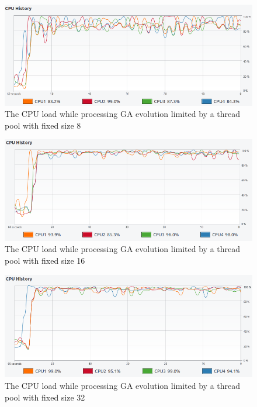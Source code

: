 \begin{figure}[t]
\centering\includegraphics[width=\textwidth]{img/exp/2/limit-threadpool-8}
\caption{The CPU load while processing GA evolution limited by a thread pool with fixed size 8 }  \label{img:cpu-thread-8}
\end{figure}

\begin{figure}[t]
\centering\includegraphics[width=\textwidth]{img/exp/2/limit-threadpool-16}
\caption{The CPU load while processing GA evolution limited by a thread pool with fixed size 16 }  \label{img:cpu-thread-16}
\end{figure}

\begin{figure}[t]
\centering\includegraphics[width=\textwidth]{img/exp/2/limit-threadpool-32}
\caption{The CPU load while processing GA evolution limited by a thread pool with fixed size 32 }  \label{img:cpu-thread-32}
\end{figure}


